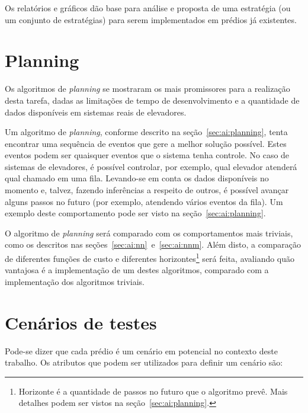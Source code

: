 Os relatórios e gráficos dão base para análise e proposta de uma estratégia (ou
um conjunto de estratégias) para serem implementados em prédios já existentes.

\section{\label{sec:objectives:planning}Planning}


Os algoritmos de \textit{planning} se mostraram os mais promissores para a
realização desta tarefa, dadas as limitações de tempo de desenvolvimento e a
quantidade de dados disponíveis em sistemas reais de elevadores.

Um algoritmo de \textit{planning}, conforme descrito na
seção~\ref{sec:ai:planning}, tenta encontrar uma sequência de eventos que gere a
melhor solução possível. Estes eventos podem ser quaisquer eventos que o sistema
tenha controle. No caso de sistemas de elevadores, é possível controlar, por
exemplo, qual elevador atenderá qual chamado em uma fila. Levando-se em conta os
dados disponíveis no momento e, talvez, fazendo inferências a respeito de
outros, é possível avançar alguns passos no futuro (por exemplo, atendendo
vários eventos da fila). Um exemplo deste comportamento pode ser visto na
seção~\ref{sec:ai:planning}.

O algoritmo de \textit{planning} será comparado com os comportamentos mais
triviais, como os descritos nas seções~\ref{sec:ai:nn}~e~\ref{sec:ai:nnm}. Além
disto, a comparação de diferentes funções de custo e diferentes
horizontes\footnote{Horizonte é a quantidade de passos no futuro que o algoritmo
prevê. Mais detalhes podem ser vistos na seção~\ref{sec:ai:planning}.} será
feita, avaliando quão vantajosa é a implementação de um destes algoritmos,
comparado com a implementação dos algoritmos triviais.

\section{\label{section:scenarios}Cenários de testes}

Pode-se dizer que cada prédio é um cenário em potencial no contexto deste
trabalho. Os atributos que podem ser utilizados para definir um cenário são:

